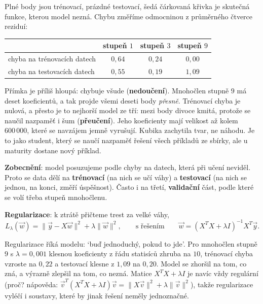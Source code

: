Plné body jsou trénovací, prázdné testovací, šedá čárkovaná křivka je skutečná funkce, kterou model nezná. Chybu změříme odmocninou z průměrného čtverce reziduí:

\begin{center}
  \begin{tabular}{lccc}
    & stupeň $1$ & stupeň $3$ & stupeň $9$\\\hline
    chyba na trénovacích datech & $0{,}64$ & $0{,}24$ & $0{,}00$\\
    chyba na testovacích datech & $0{,}55$ & $0{,}19$ & $1{,}09$
  \end{tabular}
\end{center}

Přímka je příliš hloupá: chybuje všude (\textbf{nedoučení}). Mnohočlen stupně $9$ má deset koeficientů, a tak projde všemi deseti body \textit{přesně}. Trénovací chyba je nulová, a přesto je to nejhorší model ze tří: mezi body divoce kmitá, protože se naučil nazpaměť i šum (\textbf{přeučení}). Jeho koeficienty mají velikost až kolem $600\,000$, které se navzájem jemně vyrušují. Kubika zachytila tvar, ne náhodu. Je to jako student, který se naučí nazpaměť řešení všech příkladů ze sbírky, ale u maturity dostane nový příklad.

\begin{definitionbox}
  \textbf{Zobecnění}: model posuzujeme podle chyby na datech, která při učení neviděl. Proto se data dělí na \textbf{trénovací} (na nich se učí váhy) a \textbf{testovací} (na nich se jednou, na konci, změří úspěšnost). Často i na třetí, \textbf{validační} část, podle které se volí třeba stupeň mnohočlenu.

  \vspace{0.2cm}

  \textbf{Regularizace}: k ztrátě přičteme trest za velké váhy,
  \begin{equation*}
    L_\lambda(\vec{w}) = \|\vec{y} - X\vec{w}\|^2 + \lambda\|\vec{w}\|^2,\qquad\text{s řešením}\qquad\vec{w} = {(X^TX + \lambda I)}^{-1}X^T\vec{y}.
  \end{equation*}
\end{definitionbox}

Regularizace říká modelu: `buď jednoduchý, pokud to jde'. Pro mnohočlen stupně $9$ s $\lambda = 0{,}001$ klesnou koeficienty z řádu statisíců zhruba na $10$, trénovací chyba vzroste na $0{,}22$ a testovací klesne z $1{,}09$ na $0{,}20$. Model se zhoršil na tom, co zná, a výrazně zlepšil na tom, co nezná. Matice $X^TX + \lambda I$ je navíc vždy regulární (proč? nápověda: $\vec{v}^T(X^TX + \lambda I)\vec{v} = \|X\vec{v}\|^2 + \lambda\|\vec{v}\|^2$), takže regularizace vyléčí i soustavy, které by jinak řešení neměly jednoznačné.

